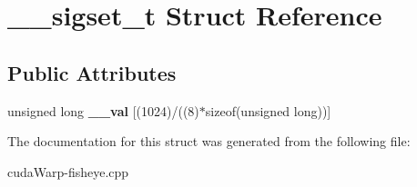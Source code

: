 \hypertarget{struct____sigset__t}{}\section{\+\_\+\+\_\+sigset\+\_\+t Struct Reference}
\label{struct____sigset__t}
\subsection*{Public Attributes}
\begin{DoxyCompactItemize}
\item 
unsigned long {\bfseries \+\_\+\+\_\+val} \mbox{[}(1024)/((8)$\ast$sizeof(unsigned long))\mbox{]}\hypertarget{struct____sigset__t_a42bc253feccc23f02e5c0af19c2a7d17}{}\label{struct____sigset__t_a42bc253feccc23f02e5c0af19c2a7d17}

\end{DoxyCompactItemize}


The documentation for this struct was generated from the following file\+:\begin{DoxyCompactItemize}
\item 
cuda\+Warp-\/fisheye.\+cpp\end{DoxyCompactItemize}
